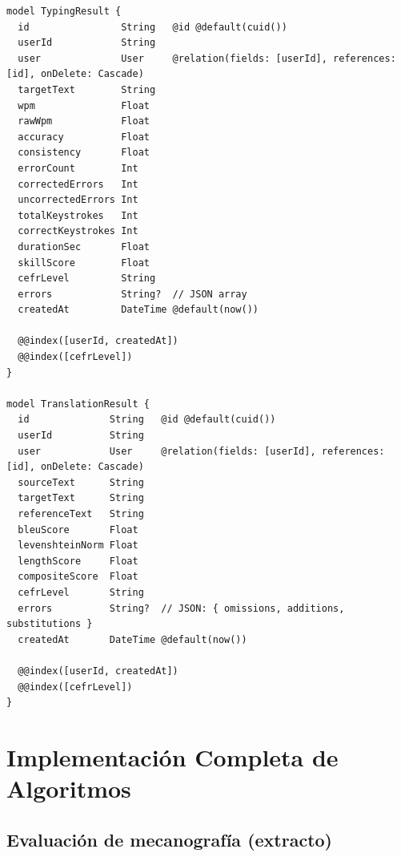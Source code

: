 \begin{lstlisting}[style=sql,caption={Modelos para resultados de mecanografía y traducción}]
model TypingResult {
  id                String   @id @default(cuid())
  userId            String
  user              User     @relation(fields: [userId], references: [id], onDelete: Cascade)
  targetText        String
  wpm               Float
  rawWpm            Float
  accuracy          Float
  consistency       Float
  errorCount        Int
  correctedErrors   Int
  uncorrectedErrors Int
  totalKeystrokes   Int
  correctKeystrokes Int
  durationSec       Float
  skillScore        Float
  cefrLevel         String
  errors            String?  // JSON array
  createdAt         DateTime @default(now())

  @@index([userId, createdAt])
  @@index([cefrLevel])
}

model TranslationResult {
  id              String   @id @default(cuid())
  userId          String
  user            User     @relation(fields: [userId], references: [id], onDelete: Cascade)
  sourceText      String
  targetText      String
  referenceText   String
  bleuScore       Float
  levenshteinNorm Float
  lengthScore     Float
  compositeScore  Float
  cefrLevel       String
  errors          String?  // JSON: { omissions, additions, substitutions }
  createdAt       DateTime @default(now())

  @@index([userId, createdAt])
  @@index([cefrLevel])
}
\end{lstlisting}

\chapter{Implementación Completa de Algoritmos}
\label{app:algorithms-code}

\section{Evaluación de mecanografía (extracto)}

